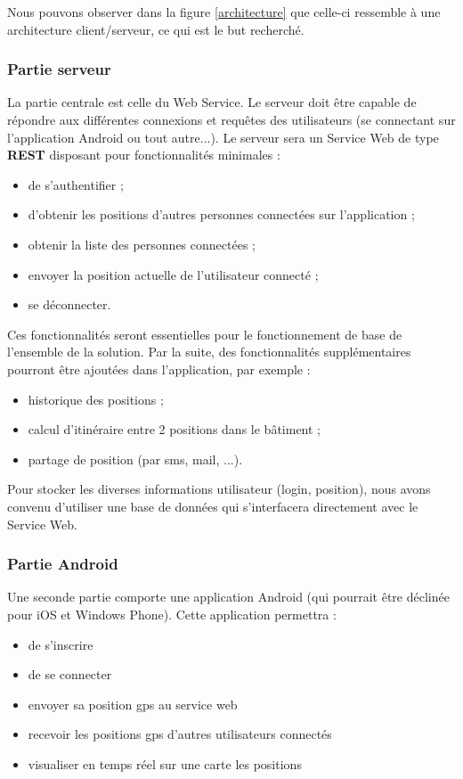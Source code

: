 Nous pouvons observer dans la figure \ref{architecture} que celle-ci ressemble à une architecture client/serveur, ce qui est le but recherché.

\subsubsection{Partie serveur}
La partie centrale est celle du Web Service. Le serveur doit être capable de répondre aux différentes connexions et requêtes des utilisateurs (se connectant sur l'application Android ou tout autre...). Le serveur sera un Service Web de type \textbf{REST} disposant pour fonctionnalités minimales :
\begin{itemize}
    \item de s'authentifier ;
    \item d'obtenir les positions d'autres personnes connectées sur l'application ;
    \item obtenir la liste des personnes connectées ;
    \item envoyer la position actuelle de l'utilisateur connecté ;
    \item se déconnecter.
\end{itemize}

Ces fonctionnalités seront essentielles pour le fonctionnement de base de l'ensemble de la solution. Par la suite, des fonctionnalités supplémentaires pourront être ajoutées dans l'application, par exemple :
\begin{itemize}
    \item historique des positions ;
    \item calcul d'itinéraire entre 2 positions dans le bâtiment ;
    \item partage de position (par sms, mail, ...).
\end{itemize}

Pour stocker les diverses informations utilisateur (login, position), nous avons convenu d'utiliser une base de données qui s'interfacera directement avec le Service Web.

\subsubsection{Partie Android}
Une seconde partie comporte une application Android (qui pourrait être déclinée pour iOS et Windows Phone). Cette application permettra :
\begin{itemize}
    \item de s'inscrire
    \item de se connecter
    \item envoyer sa position gps au service web
    \item recevoir les positions gps d'autres utilisateurs connectés
    \item visualiser en temps réel sur une carte les positions
\end{itemize}

